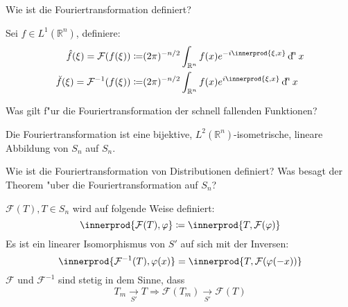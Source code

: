 \documentclass[9pt]{article}
\newcommand{\Rn}{\mathbb{R}^n}
\DeclarePairedDelimiter{\innerprod}\langle\rangle
\newenvironment{field}{}{\newpage}
\newif\ifnote
\newenvironment{note}{\notetrue}{\notefalse}
\newcommand{\localtag}{}
\newcommand{\globaltag}{}
\newcommand{\uuid}{}
\newcommand{\tags}[1]{
    \ifnote 
        \renewcommand{\localtag}{#1}
    \else
        \renewcommand{\globaltag}{#1}
    \fi 
    }
\newcommand{\xplain}[1]{\renewcommand{\uuid}{#1}}
\begin{document}
		\begin{note}
			\xplain{485b40ca-ec84-4d95-a49b-4735b461a33f}
			\tags{}
			
			\begin{field}  %
				Wie ist die Fouriertransformation definiert?
			\end{field}
			
			\begin{field}  %
				Sei $f\in L^1(\Rn)$, definiere:
				\begin{align*}
					\hat{f}(\xi) = \mathcal{F}(f(\xi)) \coloneqq& (2\pi)^{-n/2} \int_{\Rn} f(x) e^{-i\innerprod{\xi,x}} \dif^n x\\
					\breve{f}(\xi) = \mathcal{F}^{-1}(f(\xi)) \coloneqq& (2\pi)^{-n/2} \int_{\Rn} f(x) e^{i\innerprod{\xi,x}} \dif^n x
				\end{align*} 
			\end{field}
			
		\begin{field}  %
			Was gilt f"ur die Fouriertransformation der schnell fallenden Funktionen?
		\end{field}
		
		\begin{field}  %
			Die Fouriertransformation ist eine bijektive, $L^2(\Rn)$-isometrische, lineare Abbildung von $S_n$ auf $S_n$.
		\end{field}
			
		\begin{field}  %
			Wie ist die Fouriertransformation von Distributionen definiert? Was besagt der Theorem "uber die Fouriertransformation auf $S_n$?
		\end{field}

		\begin{field}  %
					 	$\mathcal{F}(T), T\in S_n$ wird auf folgende Weise definiert:
			\begin{equation*}
			\innerprod{\mathcal{F}(T), \varphi} \coloneqq \innerprod{T, \mathcal{F}(\varphi)}
			\end{equation*}
			Es ist ein linearer Isomorphismus von $S'$ auf sich mit der Inversen:
			\begin{equation*}
			\innerprod{\mathcal{F}^{-1}(T), \varphi(x)} = \innerprod{T, \mathcal{F}(\varphi(-x))}
			\end{equation*}
			$\mathcal{F}$ und $\mathcal{F}^{-1}$ sind stetig in dem Sinne, dass
			\begin{equation*}
			T_m \underset{S'}{\rightarrow} T \Rightarrow \mathcal{F}(T_m) 
			\underset{S'}{\rightarrow} \mathcal{F}(T)
			\end{equation*}
		\end{field}
			

\end{note}
\end{document}
